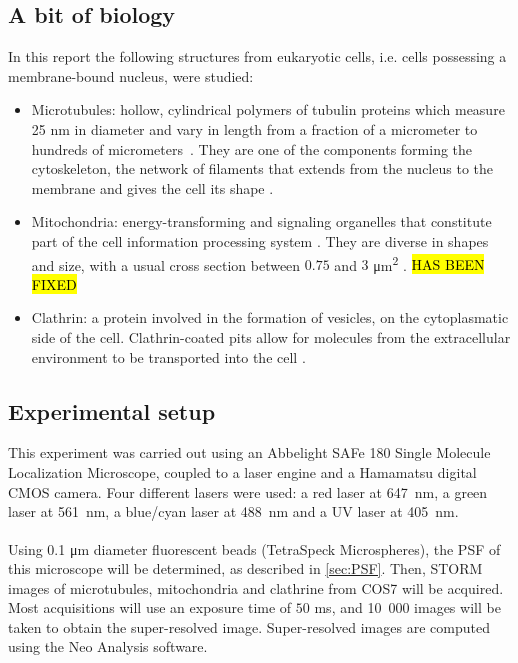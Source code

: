 \subsection{A bit of biology} \label{sec:biology}
In this report the following structures from eukaryotic cells, i.e. cells possessing a membrane-bound nucleus, were studied:
\begin{itemize}
    \item Microtubules: hollow, cylindrical polymers of tubulin proteins which measure 25 nm
    in diameter and vary in length from a fraction of a micrometer to hundreds of \mbox{micrometers \cite{lodish_molecular_2004}.}
    They are one of the components forming the cytoskeleton, the network of filaments that extends from the nucleus to the membrane and gives the cell its shape \cite{douglass_notice_2023}.
    \item Mitochondria: energy-transforming and signaling organelles that constitute part of the cell information processing system \cite{picard_mitochondrial_2022}. They are diverse in shapes and size, with a usual cross section between $0.75$ and $3$ \unit{\micro\meter\squared} \cite{wiemerslage_quantification_2016}. \hl{HAS BEEN FIXED}
    \item Clathrin: a protein involved in the formation of vesicles, on the cytoplasmatic side of the cell. 
    Clathrin-coated pits allow for molecules from the extracellular environment to be transported into the cell \cite{douglass_notice_2023}.
\end{itemize}


\subsection{Experimental setup} \label{sec:experimental_setup}
This experiment was carried out using an Abbelight SAFe 180 Single Molecule Localization Microscope, coupled to a laser engine and a Hamamatsu digital CMOS camera. Four different lasers were used: a red laser at \mbox{647 nm}, a green laser at \mbox{561 nm}, a blue/cyan laser at \mbox{488 nm} and a UV laser at \mbox{405 nm}.

Using 0.1 \si{\micro\meter} diameter fluorescent beads (TetraSpeck\textsuperscript{\texttrademark} Microspheres), the PSF of this microscope will be determined, as described in \autoref{sec:PSF}. Then, STORM images of microtubules, mitochondria and clathrine from COS7 will be acquired. Most acquisitions will use an exposure time of $50$ ms, and \mbox{10 000} images will be taken to obtain the super-resolved image. Super-resolved images are computed using the Neo Analysis software.


